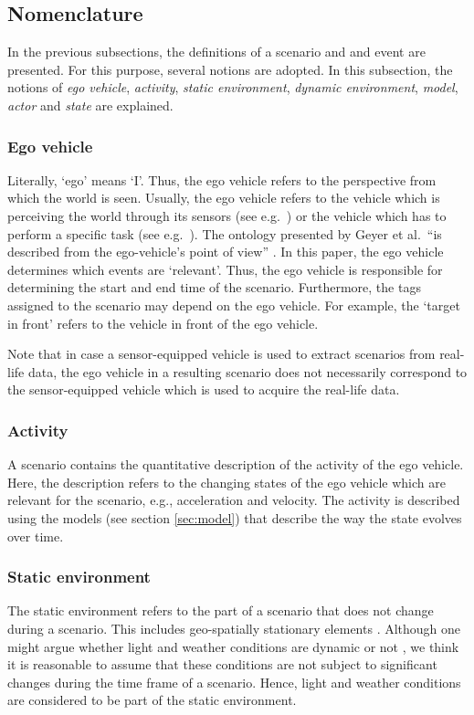 \subsection{Nomenclature}
\label{sec:nomenclature}

In the previous subsections, the definitions of a scenario and and event are presented. For this purpose, several notions are adopted. In this subsection, the notions of \emph{ego vehicle}, \emph{activity}, \emph{static environment}, \emph{dynamic environment}, \emph{model}, \emph{actor} and \emph{state} are explained. 

\subsubsection{Ego vehicle}
\label{sec:ego vehicle}
Literally, `ego' means `I'. Thus, the ego vehicle refers to the perspective from which the world is seen. Usually, the ego vehicle refers to the vehicle which is perceiving the world through its sensors (see e.g.\ \cite{Bonnin2014}) or the vehicle which has to perform a specific task (see e.g.\ \cite{althoff2017CommonRoad}). The ontology presented by Geyer et al.\ ``is described from the ego-vehicle’s point of view'' \cite{geyer2014}. In this paper, the ego vehicle determines which events are `relevant'. Thus, the ego vehicle is responsible for determining the start and end time of the scenario. Furthermore, the tags assigned to the scenario may depend on the ego vehicle. For example, the `target in front' refers to the vehicle in front of the ego vehicle. 

Note that in case a sensor-equipped vehicle is used to extract scenarios from real-life data, the ego vehicle in a resulting scenario does not necessarily correspond to the sensor-equipped vehicle which is used to acquire the real-life data.

\subsubsection{Activity}
\label{sec:activity}
A scenario contains the quantitative description of the activity of the ego vehicle. Here, the description refers to the changing states of the ego vehicle which are relevant for the scenario, e.g., acceleration and velocity. The activity is described using the models (see section \ref{sec:model}) that describe the way the state evolves over time.

\subsubsection{Static environment}
\label{sec:static environment}
The static environment refers to the part of a scenario that does not change during a scenario. This includes geo-spatially stationary elements \cite{ulbrich2015}. Although one might argue whether light and weather conditions are dynamic or not \cite{geyer2014,bach2016modelbased}, we think it is reasonable to assume that these conditions are not subject to significant changes during the time frame of a scenario. Hence, light and weather conditions are considered to be part of the static environment.

